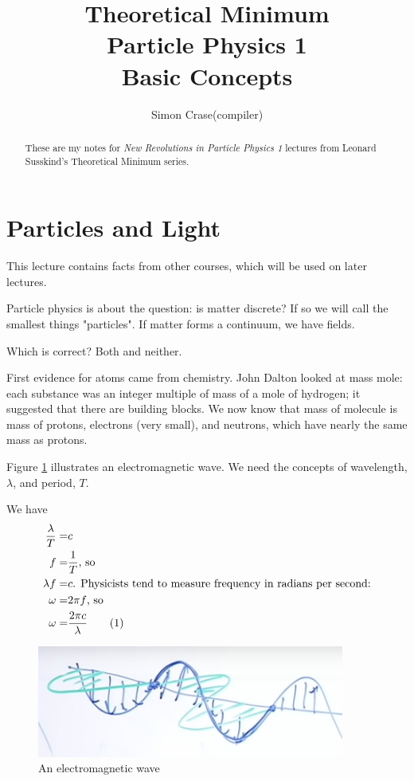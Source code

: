 \documentclass[]{article}
\title{Theoretical Minimum\\Particle Physics 1\\Basic Concepts}
\author{Simon Crase(compiler)}
\newcommand\numberthis{\addtocounter{equation}{1}\tag{\theequation}}
\begin{document}
\maketitle

\begin{abstract}
These are my notes for \emph{New Revolutions in Particle Physics 1} lectures from Leonard Susskind's Theoretical Minimum series.
\end{abstract}

\tableofcontents
\listoffigures
\listoftables
\listoftheorems

\section{Particles and Light}

This lecture contains  facts from other courses, which will be used on later lectures.

Particle physics is about the question: is matter discrete? If so we will call the smallest things "particles". If matter forms a continuum, we have fields.

Which is correct? Both and neither.

First evidence for atoms came from chemistry. John Dalton looked at mass mole: each substance was an integer multiple of mass of a mole of hydrogen; it suggested that there are building blocks. We now know that mass of molecule is mass of protons, electrons (very small), and neutrons, which have nearly the same mass as protons. 
 
Figure \ref{fig:em:wave} illustrates an electromagnetic wave. We need the concepts of wavelength, $\lambda$, and period, $T$.

We have
\begin{align*}
\frac{\lambda}{T}=&c\\
f=&\frac{1}{T} \text{, so}\\
\lambda f =& c\text{. Physicists tend to measure frequency in radians per second:}\\
\omega =& 2 \pi f \text{, so} \\
\omega =& \frac{2 \pi c}{\lambda} \numberthis \label{eq:omega:lambda}
\end{align*}

\begin{figure}[H]
	\caption{An electromagnetic wave}\label{fig:em:wave}  
	\includegraphics[width=0.9\textwidth]{Wavelength}
\end{figure}
\end{document}
